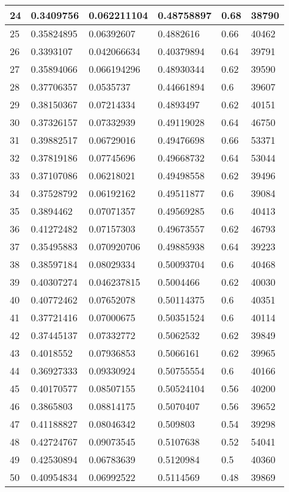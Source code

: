 \begin{longtable}{|l|l|l|l|l|l|}
24 & 0.3409756 & 0.062211104 & 0.48758897 & 0.68 & 38790 \\ \hline 
25 & 0.35824895 & 0.06392607 & 0.4882616 & 0.66 & 40462 \\ \hline 
26 & 0.3393107 & 0.042066634 & 0.40379894 & 0.64 & 39791 \\ \hline 
27 & 0.35894066 & 0.066194296 & 0.48930344 & 0.62 & 39590 \\ \hline 
28 & 0.37706357 & 0.0535737 & 0.44661894 & 0.6 & 39607 \\ \hline 
29 & 0.38150367 & 0.07214334 & 0.4893497 & 0.62 & 40151 \\ \hline 
30 & 0.37326157 & 0.07332939 & 0.49119028 & 0.64 & 46750 \\ \hline 
31 & 0.39882517 & 0.06729016 & 0.49476698 & 0.66 & 53371 \\ \hline 
32 & 0.37819186 & 0.07745696 & 0.49668732 & 0.64 & 53044 \\ \hline 
33 & 0.37107086 & 0.06218021 & 0.49498558 & 0.62 & 39496 \\ \hline 
34 & 0.37528792 & 0.06192162 & 0.49511877 & 0.6 & 39084 \\ \hline 
35 & 0.3894462 & 0.07071357 & 0.49569285 & 0.6 & 40413 \\ \hline 
36 & 0.41272482 & 0.07157303 & 0.49673557 & 0.62 & 46793 \\ \hline 
37 & 0.35495883 & 0.070920706 & 0.49885938 & 0.64 & 39223 \\ \hline 
38 & 0.38597184 & 0.08029334 & 0.50093704 & 0.6 & 40468 \\ \hline 
39 & 0.40307274 & 0.046237815 & 0.5004466 & 0.62 & 40030 \\ \hline 
40 & 0.40772462 & 0.07652078 & 0.50114375 & 0.6 & 40351 \\ \hline 
41 & 0.37721416 & 0.07000675 & 0.50351524 & 0.6 & 40114 \\ \hline 
42 & 0.37445137 & 0.07332772 & 0.5062532 & 0.62 & 39849 \\ \hline 
43 & 0.4018552 & 0.07936853 & 0.5066161 & 0.62 & 39965 \\ \hline 
44 & 0.36927333 & 0.09330924 & 0.50755554 & 0.6 & 40166 \\ \hline 
45 & 0.40170577 & 0.08507155 & 0.50524104 & 0.56 & 40200 \\ \hline 
46 & 0.3865803 & 0.08814175 & 0.5070407 & 0.56 & 39652 \\ \hline 
47 & 0.41188827 & 0.08046342 & 0.509803 & 0.54 & 39298 \\ \hline 
48 & 0.42724767 & 0.09073545 & 0.5107638 & 0.52 & 54041 \\ \hline 
49 & 0.42530894 & 0.06783639 & 0.5120984 & 0.5 & 40360 \\ \hline 
50 & 0.40954834 & 0.06992522 & 0.5114569 & 0.48 & 39869 \\ \hline 
\end{longtable}